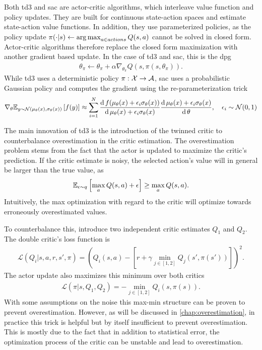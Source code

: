 Both \ac{td3} and \ac{sac} are actor-critic algorithms, which interleave value function and policy updates.
They are built for continuous state-action spaces and estimate state-action value functions.
In addition, they use parameterized policies, as the policy update $\pi(\cdot|s) \leftarrow \operatorname*{arg\,max}_{a \in actions} Q(s,a)$ cannot be solved in closed form.
Actor-critic algorithms therefore replace the closed form maximization with another gradient based update.
In the case of \ac{td3} and \ac{sac}, this is the \ac{dpg} \parencite{silver2014deterministic}
\begin{align}
    \theta_\pi \leftarrow \theta_\pi + \alpha \nabla_{\theta_\pi} Q(s, \pi(s, \theta_\pi)).
\end{align}
While \ac{td3} uses a deterministic policy $\pi: \mathcal{X} \rightarrow \mathcal{A}$, \ac{sac} uses a probabilistic Gaussian policy and computes the gradient using the re-parameterization trick
\begin{align}
    \nabla_{\theta} \mathbb{E}_{y \sim \mathcal{N}(\mu_\theta(x), \sigma_\theta(x))}\left[  f(y) \right] \approx \sum_{i=1}^{N} \frac{\mathrm{d}\,f(\mu_\theta(x) + \epsilon_i \sigma_\theta(x))}{\mathrm{d}\, \mu_\theta(x) + \epsilon_i \sigma_\theta(x)}  \frac{\mathrm{d}\,\mu_\theta(x) + \epsilon_i \sigma_\theta(x)}{\mathrm{d}\,\theta}, \quad \epsilon_i \sim \mathcal{N}(0,1)
\end{align}

The main innovation of \ac{td3} is the introduction of the twinned critic to counterbalance overestimation in the critic estimation.
The overestimation problem stems from the fact that the actor is updated to maximize the critic's prediction.
If the critic estimate is noisy, the selected action's value will in general be larger than the true value, as
\begin{align}
    \mathbb{E}_{\epsilon\sim q}\left[  \max_a Q(s,a) + \epsilon \right] \geq \max_a Q(s,a).
\end{align}
Intuitively, the max optimization with regard to the critic will optimize towards erroneously overestimated values.

To counterbalance this, \textcite{fujimoto2018addressing} introduce two independent critic estimates $Q_1$ and $Q_2$.
The double critic's loss function is
\begin{align}
    \mathcal{L}(Q_i| s, a, r, s', \pi) = \left(Q_i(s,a) - \left[r + \gamma \min_{j \in [1,2]}Q_j(s', \pi(s'))\right]\right)^2.
\end{align}
The actor update also maximizes this minimum over both critics
\begin{align}
    \mathcal{L}(\pi| s, Q_1, Q_2) = - \min_{j \in [1,2]} Q_i(s, \pi(s)).
\end{align}
With some assumptions on the noise this max-min structure can be proven to prevent overestimation.
However, as will be discussed in \autoref{chap:overestimation}, in practice this trick is helpful but by itself insufficient to prevent overestimation.
This is mostly due to the fact that in addition to statistical error, the optimization process of the critic can be unstable and lead to overestimation.

